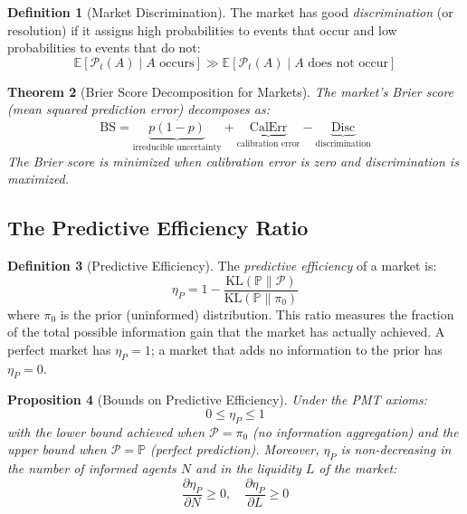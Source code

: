 \documentclass[12pt,a4paper]{article}
\newtheorem{theorem}{Theorem}[section]
\newtheorem{proposition}[theorem]{Proposition}
\theoremstyle{definition}
\newtheorem{definition}[theorem]{Definition}
\newcommand{\E}{\mathbb{E}}
\newcommand{\Prob}{\mathbb{P}}
\newcommand{\PP}{\mathcal{P}}
\newcommand{\KL}{\mathrm{KL}}
\begin{document}
\begin{definition}[Market Discrimination]\label{def:discrimination}
The market has good \emph{discrimination} (or resolution) if it assigns high probabilities to events that occur and low probabilities to events that do not:
\begin{equation}
    \E[\PP_t(A) \mid A \text{ occurs}] \gg \E[\PP_t(A) \mid A \text{ does not occur}]
\end{equation}
\end{definition}

\begin{theorem}[Brier Score Decomposition for Markets]\label{thm:brier}
The market's Brier score (mean squared prediction error) decomposes as:
\begin{equation}\label{eq:brier_decomp}
    \text{BS} = \underbrace{\overline{p(1-p)}}_{\text{irreducible uncertainty}} + \underbrace{\text{CalErr}}_{\text{calibration error}} - \underbrace{\text{Disc}}_{\text{discrimination}}
\end{equation}
The Brier score is minimized when calibration error is zero and discrimination is maximized.
\end{theorem}

\subsection{The Predictive Efficiency Ratio}

\begin{definition}[Predictive Efficiency]\label{def:pred_efficiency}
The \emph{predictive efficiency} of a market is:
\begin{equation}\label{eq:pred_efficiency}
    \eta_P = 1 - \frac{\KL(\Prob \| \PP)}{\KL(\Prob \| \pi_0)}
\end{equation}
where $\pi_0$ is the prior (uninformed) distribution. This ratio measures the fraction of the total possible information gain that the market has actually achieved. A perfect market has $\eta_P = 1$; a market that adds no information to the prior has $\eta_P = 0$.
\end{definition}

\begin{proposition}[Bounds on Predictive Efficiency]\label{prop:eff_bounds}
Under the PMT axioms:
\begin{equation}
    0 \leq \eta_P \leq 1
\end{equation}
with the lower bound achieved when $\PP = \pi_0$ (no information aggregation) and the upper bound when $\PP = \Prob$ (perfect prediction). Moreover, $\eta_P$ is non-decreasing in the number of informed agents $N$ and in the liquidity $L$ of the market:
\begin{equation}
    \frac{\partial \eta_P}{\partial N} \geq 0, \quad \frac{\partial \eta_P}{\partial L} \geq 0
\end{equation}
\end{proposition}
\end{document}
